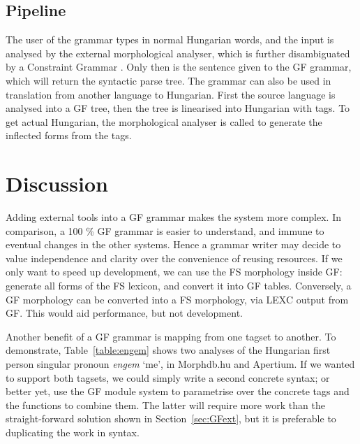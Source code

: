 \documentclass[10pt,a4paper]{article}
\begin{document}
\subsection{Pipeline}

The user of the grammar types in normal Hungarian words, and the input is analysed 
by the external morphological analyser, which is further disambiguated by a 
Constraint Grammar \cite{karlsson1995constraint}. Only then is the sentence given to the GF grammar, 
which will return the syntactic parse tree.
The grammar can also be used in translation from another language
to Hungarian. First the source language is analysed into a GF tree,
then the tree is linearised into Hungarian with tags. To get actual
Hungarian, the morphological analyser is called to generate
the inflected forms from the tags.



\section{Discussion}

Adding external tools into a GF grammar makes the system more
complex. In comparison, a 100 \% GF grammar is easier to understand,
and immune to eventual changes in the other systems. Hence a grammar
writer may decide to value independence and clarity over the convenience of reusing resources.
If we only want to speed up development, we can use the FS morphology
inside GF: generate all forms of the FS lexicon, and convert it into GF
tables. 
Conversely, a GF morphology can be converted
into a FS morphology, via LEXC output from GF. This would aid
performance, but not development.

Another benefit of a GF grammar is mapping from one tagset to another.
To demonstrate, Table~\ref{table:engem} shows two analyses of the Hungarian first
person singular pronoun \emph{engem} `me', in Morphdb.hu \cite{tron2006morphdb} and Apertium.
If we wanted to support both tagsets, we could simply write a
second concrete syntax; or better yet, use the GF module system to
parametrise over the concrete tags and the functions to combine
them. The latter will require more work than the straight-forward
solution shown in Section~\ref{sec:GFext}, but it is preferable to duplicating the work in syntax.
\end{document}

